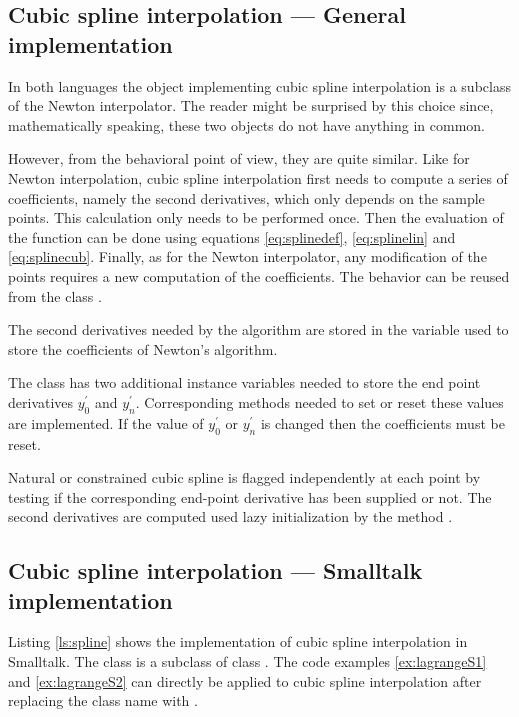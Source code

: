 \subsection{Cubic spline interpolation --- General  implementation}
 In both languages the object
implementing cubic spline interpolation is a subclass of the
Newton interpolator. The reader might be surprised by this choice
since, mathematically speaking, these two objects do not have
anything in common.

However, from the behavioral point of view, they are quite
similar. Like for Newton interpolation, cubic spline interpolation
first needs to compute a series of coefficients, namely the second
derivatives, which only depends on the sample points. This
calculation only needs to be performed once. Then the evaluation
of the function can be done using equations \ref{eq:splinedef},
\ref{eq:splinelin} and \ref{eq:splinecub}. Finally, as for the
Newton interpolator, any modification of the points requires a new
computation of the coefficients. The behavior can be reused from
the class .

The second derivatives needed by the algorithm are stored in the
variable used to store the coefficients of Newton's algorithm.

The class  has two additional instance
variables needed to store the end point derivatives $y^{\prime}_0$
and $y^{\prime}_n$. Corresponding methods needed to set or reset
these values are implemented. If the value of $y^{\prime}_0$ or
$y^{\prime}_n$ is changed then the coefficients must be reset.

Natural or constrained cubic spline is flagged independently at
each point by testing if the corresponding end-point derivative
has been supplied or not. The second derivatives are computed used
lazy initialization by the method .

\subsection{Cubic spline interpolation --- Smalltalk  implementation}
Listing \ref{ls:spline} shows the implementation of cubic spline
interpolation in Smalltalk. The class 
is a subclass of class . The code
examples \ref{ex:lagrangeS1} and \ref{ex:lagrangeS2} can directly
be applied to cubic spline interpolation after replacing the class
name  with .

